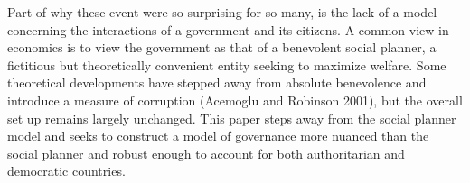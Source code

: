 \documentclass[12pt]{article}
\begin{document}
\begin{spacing}{1.5}
Part of why these event were so surprising for so many, is the lack of a model concerning the interactions of a government and its citizens. A common view in economics is to view the government as that of a benevolent social planner, a fictitious  but theoretically convenient entity seeking to maximize welfare. Some theoretical developments have stepped away from absolute benevolence and introduce a measure of corruption (Acemoglu and Robinson 2001), but the overall set up remains largely unchanged. This paper steps away from the social planner model and seeks to construct a model of governance more nuanced than the social planner and robust enough to account for both authoritarian and democratic countries.  
  




\end{spacing}
\end{document}
